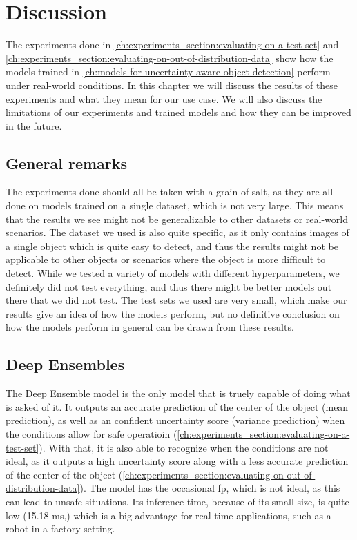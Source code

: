 
\chapter{Discussion}
The experiments done in \cref{ch:experiments_section:evaluating-on-a-test-set} and \cref{ch:experiments_section:evaluating-on-out-of-distribution-data} show how the models trained in \cref{ch:models-for-uncertainty-aware-object-detection} perform under real-world conditions.
In this chapter we will discuss the results of these experiments and what they mean for our use case.
We will also discuss the limitations of our experiments and trained models and how they can be improved in the future.

\section{General remarks}
The experiments done should all be taken with a grain of salt, as they are all done on models trained on a single dataset, which is not very large.
This means that the results we see might not be generalizable to other datasets or real-world scenarios.
The dataset we used is also quite specific, as it only contains images of a single object which is quite easy to detect, and thus the results might not be applicable to other objects or scenarios where the object is more difficult to detect.
While we tested a variety of models with different hyperparameters, we definitely did not test everything, and thus there might be better models out there that we did not test.
The test sets we used are very small, which make our results give an idea of how the models perform, but no definitive conclusion on how the models perform in general can be drawn from these results.

\section{Deep Ensembles}
The Deep Ensemble model is the only model that is truely capable of doing what is asked of it.
It outputs an accurate prediction of the center of the object (mean prediction), as well as an confident uncertainty score (variance prediction) when the conditions allow for safe operatioin (\cref{ch:experiments_section:evaluating-on-a-test-set}).
With that, it is also able to recognize when the conditions are not ideal, as it outputs a high uncertainty score along with a less accurate prediction of the center of the object (\cref{ch:experiments_section:evaluating-on-out-of-distribution-data}).
The model has the occasional \gls{fp}, which is not ideal, as this can lead to unsafe situations.
Its inference time, because of its small size, is quite low (15.18 ms,) which is a big advantage for real-time applications, such as a robot in a factory setting.

